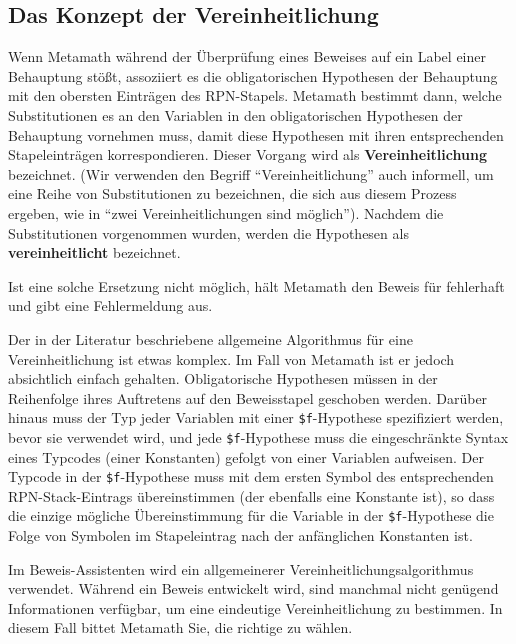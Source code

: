 \subsection{Das Konzept der Vereinheitlichung} \label{unify}

Wenn Metamath während der Überprüfung eines Beweises auf ein Label einer Behauptung stößt, assoziiert es die obligatorischen Hypothesen der Behauptung mit den obersten Einträgen des RPN-Stapels.  Metamath bestimmt dann, welche Substitutionen es an den Variablen in den obligatorischen Hypothesen der Behauptung vornehmen muss, damit diese Hypothesen mit ihren entsprechenden Stapeleinträgen korrespondieren.  Dieser Vorgang wird als {\bf Vereinheitlichung} bezeichnet.  (Wir verwenden den Begriff "`Vereinheitlichung"' auch informell, um eine Reihe von Substitutionen zu bezeichnen, die sich aus diesem Prozess ergeben, wie in "`zwei Vereinheitlichungen sind möglich"').  Nachdem die Substitutionen vorgenommen wurden, werden die Hypothesen als {\bf vereinheitlicht} bezeichnet.

Ist eine solche Ersetzung nicht möglich, hält Metamath den Beweis für fehlerhaft und gibt eine Fehlermeldung aus.

Der in der Literatur beschriebene allgemeine Algorithmus für eine Vereinheitlichung ist etwas komplex. Im Fall von Metamath ist er jedoch absichtlich einfach gehalten. Obligatorische Hypothesen müssen in der Reihenfolge ihres Auftretens auf den Beweisstapel geschoben werden. Darüber hinaus muss der Typ jeder Variablen mit einer \texttt{\$f}-Hypothese spezifiziert werden, bevor sie verwendet wird, und jede \texttt{\$f}-Hypothese muss die eingeschränkte Syntax eines Typcodes (einer Konstanten) gefolgt von einer Variablen aufweisen. Der Typcode in der \texttt{\$f}-Hypothese muss mit dem ersten Symbol des entsprechenden RPN-Stack-Eintrags übereinstimmen (der ebenfalls eine Konstante ist), so dass die einzige mögliche Übereinstimmung für die Variable in der \texttt{\$f}-Hypothese die Folge von Symbolen im Stapeleintrag nach der anfänglichen Konstanten ist.

Im Beweis-Assistenten wird ein allgemeinerer Vereinheitlichungsalgorithmus verwendet.  Während ein Beweis entwickelt wird, sind manchmal nicht genügend Informationen verfügbar, um eine eindeutige Vereinheitlichung zu bestimmen.  In diesem Fall bittet Metamath Sie, die richtige zu wählen.


